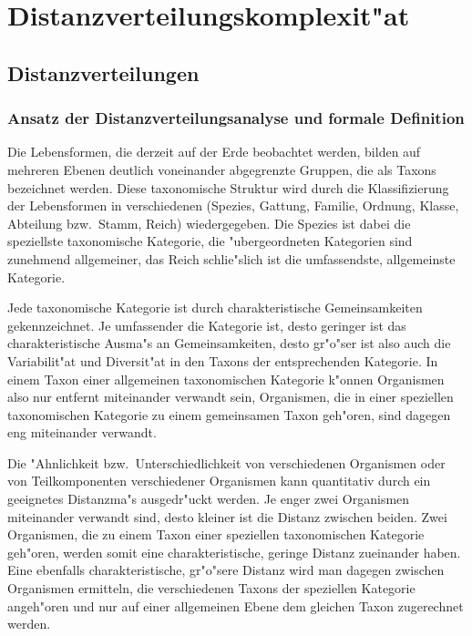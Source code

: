 \chapter{Distanzverteilungskomplexit"at}



\section{Distanzverteilungen}
\label{ddistr-method}

\subsection{Ansatz der Distanzverteilungsanalyse und formale Definition}

Die Lebensformen, die derzeit auf der Erde beobachtet werden,
bilden auf mehreren Ebenen deutlich voneinander abgegrenzte Gruppen, die als Taxons bezeichnet werden.
Diese taxonomische Struktur wird durch die Klassifizierung der Lebensformen 
in verschiedenen  (Spezies,
Gattung, Familie, Ordnung, Klasse, Abteilung bzw.\ Stamm, Reich)
wiedergegeben. Die Spezies ist dabei die speziellste taxonomische
Kategorie, die "ubergeordneten Kategorien sind zunehmend allgemeiner,
das Reich schlie"slich ist die umfassendste, allgemeinste Kategorie.

Jede taxonomische Kategorie ist durch charakteristische Gemeinsamkeiten
gekennzeichnet. Je umfassender die Kategorie ist, desto geringer ist das
charakteristische Ausma"s an Gemeinsamkeiten, desto gr"o"ser ist also
auch die Variabilit"at und Diversit"at in den Taxons der entsprechenden
Kategorie. In einem Taxon einer allgemeinen taxonomischen Kategorie k"onnen Organismen
also nur entfernt miteinander verwandt sein, Organismen, die
in einer speziellen taxonomischen Kategorie zu einem gemeinsamen Taxon
geh"oren, sind dagegen eng miteinander verwandt.

Die "Ahnlichkeit bzw.\ Unterschiedlichkeit von verschiedenen Organismen oder
von Teilkomponenten verschiedener Organismen kann quantitativ durch ein
geeignetes Distanzma"s ausgedr"uckt werden. Je enger zwei Organismen miteinander
verwandt sind, desto kleiner ist die Distanz zwischen beiden. Zwei Organismen,
die zu einem Taxon einer speziellen taxonomischen Kategorie geh"oren,
werden somit eine charakteristische, geringe Distanz zueinander haben.
Eine ebenfalls charakteristische, gr"o"sere Distanz wird man dagegen
zwischen Organismen ermitteln, die verschiedenen Taxons der speziellen
Kategorie angeh"oren und nur auf einer allgemeinen Ebene dem gleichen
Taxon zugerechnet werden.

